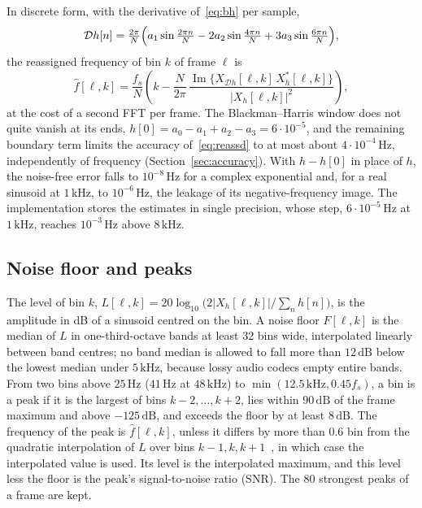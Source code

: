 \documentclass[10pt,a4paper,twocolumn]{article}
\newcommand{\Hz}{\,\mathrm{Hz}}
\newcommand{\dB}{\,\mathrm{dB}}
\renewcommand{\Im}{\operatorname{Im}}
\begin{document}
In discrete form, with the derivative of~\eqref{eq:bh} per sample,
\begin{equation}
\mathcal{D}h[n] = \tfrac{2\pi}{N}\Bigl(a_1 \sin\tfrac{2\pi n}{N} - 2a_2 \sin\tfrac{4\pi n}{N} + 3a_3 \sin\tfrac{6\pi n}{N}\Bigr),
\end{equation}
the reassigned frequency of bin $k$ of frame $\ell$ is
\begin{equation}
\hat f[\ell,k] = \frac{f_s}{N}\left( k - \frac{N}{2\pi}\, \frac{\Im\{X_{\mathcal{D}h}[\ell,k]\, X_h^*[\ell,k]\}}{|X_h[\ell,k]|^2} \right),
\label{eq:reassd}
\end{equation}
at the cost of a second FFT per frame. The Blackman--Harris window does not quite vanish at its ends, $h[0] = a_0-a_1+a_2-a_3 = 6\cdot10^{-5}$, and the remaining boundary term limits the accuracy of~\eqref{eq:reassd} to at most about $4\cdot10^{-4}\Hz$, independently of frequency (Section~\ref{sec:accuracy}). With $h - h[0]$ in place of $h$, the noise-free error falls to $10^{-8}\Hz$ for a complex exponential and, for a real sinusoid at $1\,\mathrm{kHz}$, to $10^{-6}\Hz$, the leakage of its negative-frequency image. The implementation stores the estimates in single precision, whose step, $6\cdot10^{-5}\Hz$ at $1\,\mathrm{kHz}$, reaches $10^{-3}\Hz$ above $8\,\mathrm{kHz}$.

\subsection{Noise floor and peaks}

The level of bin $k$, $L[\ell,k] = 20\log_{10}\bigl(2|X_h[\ell,k]|/\sum_n h[n]\bigr)$, is the amplitude in dB of a sinusoid centred on the bin. A noise floor $F[\ell,k]$ is the median of $L$ in one-third-octave bands at least 32 bins wide, interpolated linearly between band centres; no band median is allowed to fall more than $12\dB$ below the lowest median under $5\,\mathrm{kHz}$, because lossy audio codecs empty entire bands. From two bins above $25\Hz$ ($41\Hz$ at $48\,\mathrm{kHz}$) to $\min(12.5\,\mathrm{kHz}, 0.45 f_s)$, a bin is a peak if it is the largest of bins $k-2,\dots,k+2$, lies within $90\dB$ of the frame maximum and above $-125\dB$, and exceeds the floor by at least $8\dB$. The frequency of the peak is $\hat f[\ell,k]$, unless it differs by more than $0.6$ bin from the quadratic interpolation of $L$ over bins $k-1,k,k+1$~\cite{PARSHL,AbeSmith}, in which case the interpolated value is used. Its level is the interpolated maximum, and this level less the floor is the peak's signal-to-noise ratio (SNR). The 80 strongest peaks of a frame are kept.
\end{document}
